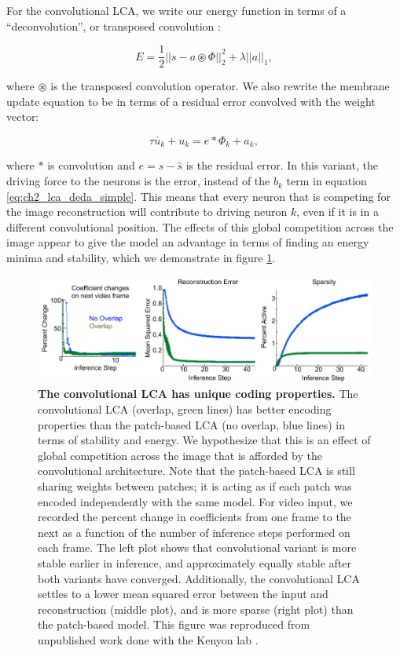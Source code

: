 For the convolutional LCA, we write our energy function in terms of a ``deconvolution'', or transposed convolution \parencite{zeiler2010deconvolutional}:

\begin{equation}
    E = \frac{1}{2} || s - a \circledast \Phi ||^{2}_{2} + \lambda ||a||_{1},
\end{equation}

\noindent where $\circledast$ is the transposed convolution operator. We also rewrite the membrane update equation to be in terms of a residual error convolved with the weight vector:

\begin{equation}\label{eq:ch2_conv_lca_dynamics}
   \tau \dot{u_{k}} + u_{k} = e \ast \Phi_{k} + a_{k},
\end{equation}

\noindent where $\ast$ is convolution and $e = s - \hat{s}$ is the residual error. In this variant, the driving force to the neurons is the error, instead of the $b_{k}$ term in equation \eqref{eq:ch2_lca_deda_simple}. This means that every neuron that is competing for the image reconstruction will contribute to driving neuron $k$, even if it is in a different convolutional position. The effects of this global competition across the image appear to give the model an advantage in terms of finding an energy minima and stability, which we demonstrate in figure \ref{fig:ch2_lca_conv_benefit}.

\begin{figure}[h]
    \centering
    \includegraphics[width=\textwidth]{figures/lca_conv_benefits.png}
    \caption{\textbf{The convolutional LCA has unique coding properties.} The convolutional LCA (overlap, green lines) has better encoding properties than the patch-based LCA (no overlap, blue lines) in terms of stability and energy. We hypothesize that this is an effect of global competition across the image that is afforded by the convolutional architecture. Note that the patch-based LCA is still sharing weights between patches; it is acting as if each patch was encoded independently with the same model. For video input, we recorded the percent change in coefficients from one frame to the next as a function of the number of inference steps performed on each frame. The left plot shows that convolutional variant is more stable earlier in inference, and approximately equally stable after both variants have converged. Additionally, the convolutional LCA settles to a lower mean squared error between the input and reconstruction (middle plot), and is more sparse (right plot) than the patch-based model. This figure was reproduced from unpublished work done with the Kenyon lab \parencite{paiton2013deep}.}
    \label{fig:ch2_lca_conv_benefit}   
\end{figure}


